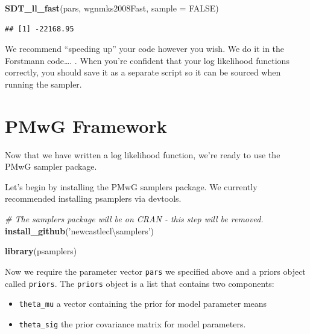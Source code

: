 \documentclass[]{book}
\newenvironment{Shaded}{\begin{snugshade}}{\end{snugshade}}
\newcommand{\CommentTok}[1]{\textcolor[rgb]{0.56,0.35,0.01}{\textit{#1}}}
\newcommand{\DataTypeTok}[1]{\textcolor[rgb]{0.13,0.29,0.53}{#1}}
\newcommand{\KeywordTok}[1]{\textcolor[rgb]{0.13,0.29,0.53}{\textbf{#1}}}
\newcommand{\NormalTok}[1]{#1}
\newcommand{\OtherTok}[1]{\textcolor[rgb]{0.56,0.35,0.01}{#1}}
\newcommand{\StringTok}[1]{\textcolor[rgb]{0.31,0.60,0.02}{#1}}
\providecommand{\tightlist}{%
  \setlength{\itemsep}{0pt}\setlength{\parskip}{0pt}}
\begin{document}
\begin{Shaded}
\begin{Highlighting}[]
\KeywordTok{SDT_ll_fast}\NormalTok{(pars, wgnmks2008Fast, }\DataTypeTok{sample =} \OtherTok{FALSE}\NormalTok{)}
\end{Highlighting}
\end{Shaded}

\begin{verbatim}
## [1] -22168.95
\end{verbatim}

 We recommend ``speeding up'' your code however you wish. We do it in the Forstmann code\ldots{}. . When you're confident that your log likelihood functions correctly, you should save it as a separate script so it can be sourced when running the sampler.

\hypertarget{pmwg-framework}{%
\section{PMwG Framework}\label{pmwg-framework}}

Now that we have written a log likelihood function, we're ready to use the PMwG sampler package.

Let's begin by installing the PMwG samplers package. We currently recommended installing psamplers via devtools.

\begin{Shaded}
\begin{Highlighting}[]
\CommentTok{# The samplers package will be on CRAN - this step will be removed.}
\KeywordTok{install_github}\NormalTok{(}\StringTok{'newcastlecl\textbackslash{}samplers'}\NormalTok{)}
\end{Highlighting}
\end{Shaded}

\begin{Shaded}
\begin{Highlighting}[]
\KeywordTok{library}\NormalTok{(psamplers)}
\end{Highlighting}
\end{Shaded}

Now we require the parameter vector \texttt{pars} we specified above and a priors object called \texttt{priors}. The \texttt{priors} object is a list that contains two components:

\begin{itemize}
\tightlist
\item
  \texttt{theta\_mu} a vector containing the prior for model parameter means
\item
  \texttt{theta\_sig} the prior covariance matrix for model parameters.
\end{itemize}
\end{document}
